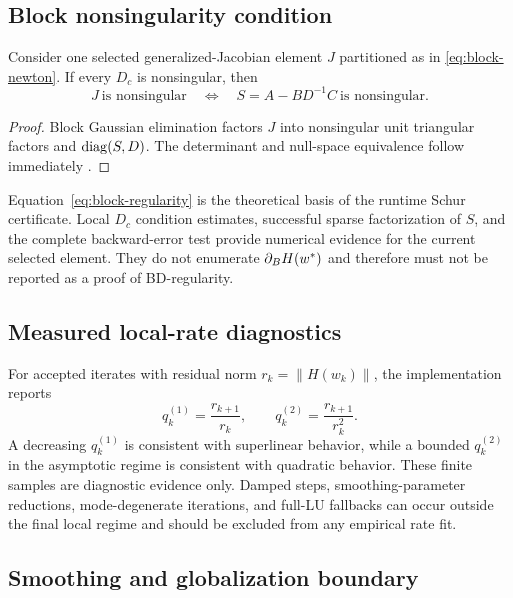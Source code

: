 \subsection{Block nonsingularity condition}

\begin{proposition}
Consider one selected generalized-Jacobian element $J$ partitioned as in
\eqref{eq:block-newton}. If every $D_c$ is nonsingular, then
\begin{equation}
 J\ \text{is nonsingular}
 \quad\Longleftrightarrow\quad
 S=A-BD^{-1}C\ \text{is nonsingular}.
 \label{eq:block-regularity}
\end{equation}
\end{proposition}

\begin{proof}
Block Gaussian elimination factors $J$ into nonsingular unit triangular
factors and $\operatorname{diag}(S,D)$. The determinant and null-space equivalence follow
immediately \cite{golub2013matrix}.
\end{proof}

Equation~\eqref{eq:block-regularity} is the theoretical basis of the runtime
Schur certificate. Local $D_c$ condition estimates, successful sparse
factorization of $S$, and the complete backward-error test provide numerical
evidence for the current selected element. They do not enumerate
$\partial_B H(w^*)$ and therefore must not be reported as a proof of BD-regularity.

\subsection{Measured local-rate diagnostics}

For accepted iterates with residual norm $r_k=\|H(w_k)\|$, the implementation
reports
\begin{equation}
 q_k^{(1)}=\frac{r_{k+1}}{r_k},\qquad
 q_k^{(2)}=\frac{r_{k+1}}{r_k^2}.
 \label{eq:rate-diagnostics}
\end{equation}
A decreasing $q_k^{(1)}$ is consistent with superlinear behavior, while a
bounded $q_k^{(2)}$ in the asymptotic regime is consistent with quadratic
behavior. These finite samples are diagnostic evidence only. Damped steps,
smoothing-parameter reductions, mode-degenerate iterations, and full-LU
fallbacks can occur outside the final local regime and should be excluded from
any empirical rate fit.

\subsection{Smoothing and globalization boundary}


